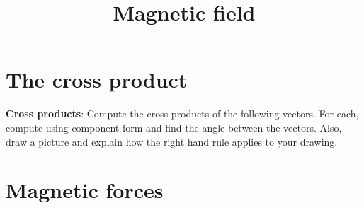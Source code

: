 \documentclass{handout}
\title{Magnetic field}
\begin{document}
\maketitle
\practiceinstructions

\section{The cross product}

\begin{questions}
    \question \textbf{Cross products}: Compute the cross products of the following vectors. For each, compute using component form and find the angle between the vectors. Also, draw a picture and explain how the right hand rule applies to your drawing.
\end{questions}

\section{Magnetic forces}
\end{document}
